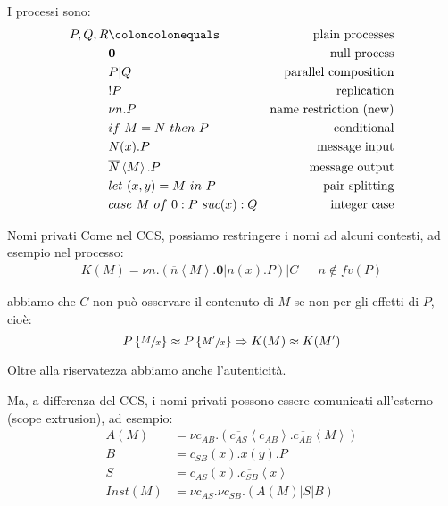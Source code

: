 \documentclass{beamer}
\theoremstyle{plain}
\theoremstyle{definition}
\theoremstyle{remark}
\newcommand{\obar}[1]{\overline{#1}}
\newcommand{\set}[1]{\left\{#1\right\}}
\newcommand{\pa}[1]{\left(#1\right)}
\newcommand{\ang}[1]{\left<#1\right>}
\begin{document}
\begin{frame}
  I processi sono:
  \begin{align*}
    P,Q,R & \coloncolonequals & \text{plain processes} \\
          & \mathbf{0} & \text{null process} \\
          & P | Q & \text{parallel composition} \\
          & !P & \text{replication} \\
          & \nu n.P & \text{name restriction (new)} \\
          & if\ M=N\ then\ P & \text{conditional} \\
          & N(x).P & \text{message input} \\
          & \obar{N}\left< M\right> .P & \text{message output} \\
          & let\ (x,y) = M\ in\ P & \text{pair splitting} \\
          & case\ M\ of\ 0: P\ suc(x): Q & \text{integer case}
  \end{align*}
\end{frame}

\begin{frame}{Nomi privati}
  Come nel CCS, possiamo restringere i nomi ad alcuni contesti, ad
  esempio nel processo:
  \begin{align*}
  K(M) = \nu n. \pa{ \obar{n}\ang{M}.\mathbf{0} | n(x).P } | C & &  n\not\in
    fv(P)
  \end{align*}
  
  abbiamo che $C$ non pu\`o osservare il contenuto di $M$ se non per gli effetti
  di $P$, cioè:
  \[ P\set{\sfrac{M}{x}} \approx P\set{\sfrac{M'}{x}} \Rightarrow K(M)
    \approx K(M') \]
  
  Oltre alla riservatezza abbiamo anche l'autenticit\`a.
\end{frame}

\begin{frame}
  Ma, a differenza del CCS, i nomi privati possono essere comunicati
  all'esterno (scope extrusion), ad esempio:
  \begin{align*}
    A(M) & = \nu
           c_{AB}. \pa{\obar{c_{AS}}\ang{c_{AB}}. \obar{c_{AB}}\ang{M}}
    \\
    B & = c_{SB}(x). x(y) .P \\
    S & = c_{AS}(x) . \obar{c_{SB}} \ang{x} \\
    Inst(M) & = \nu c_{AS}. \nu c_{SB}. \pa{ A(M) | S | B}
  \end{align*}
  \begin{center}
  \end{center}
\end{frame}
\end{document}
